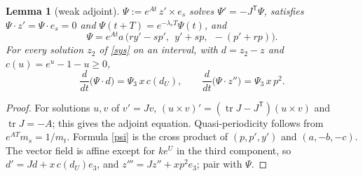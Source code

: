 \documentclass[11pt,a4paper]{article}
\newtheorem{lemma}[theorem]{Lemma}
\theoremstyle{remark}\newtheorem{remark}[theorem]{Remark}
\begin{document}
\begin{lemma}[weak adjoint]\label{lem:psi}
$\Psi:=e^{At}\,z'\times e_s$ solves $\Psi'=-J^{\mathsf T}\Psi$, satisfies
$\Psi\cdot z'=\Psi\cdot e_s=0$ and $\Psi(t+T)=e^{-\lambda_cT}\Psi(t)$, and
\begin{equation}\label{psi}
\Psi=e^{At}a\,\bigl(ry'-sp',\ \ y'+sp,\ \ -(p'+rp)\bigr).
\end{equation}
For every solution $z_2$ of \eqref{sys} on an interval, with $d=z_2-z$ and
$c(u)=e^u-1-u\ge0$,
\begin{equation}\label{chord}
\frac{d}{dt}\bigl(\Psi\cdot d\bigr)=\Psi_3\,x\,c(d_U),\qquad
\frac{d}{dt}\bigl(\Psi\cdot z''\bigr)=\Psi_3\,x\,p^2 .
\end{equation}
\end{lemma}
\begin{proof}
For solutions $u,v$ of $v'=Jv$, $(u\times v)'=(\operatorname{tr}J-J^{\mathsf T})(u\times v)$ and
$\operatorname{tr}J=-A$; this gives the adjoint equation. Quasi-periodicity follows from
$e^{AT}m_s=1/m_t$. Formula \eqref{psi} is the cross product of $(p,p',y')$ and $(a,-b,-c)$.
The vector field is affine except for $ke^U$ in the third component, so
$d'=Jd+x\,c(d_U)e_3$, and $z'''=Jz''+xp^2e_3$; pair with $\Psi$.
\end{proof}
\end{document}
